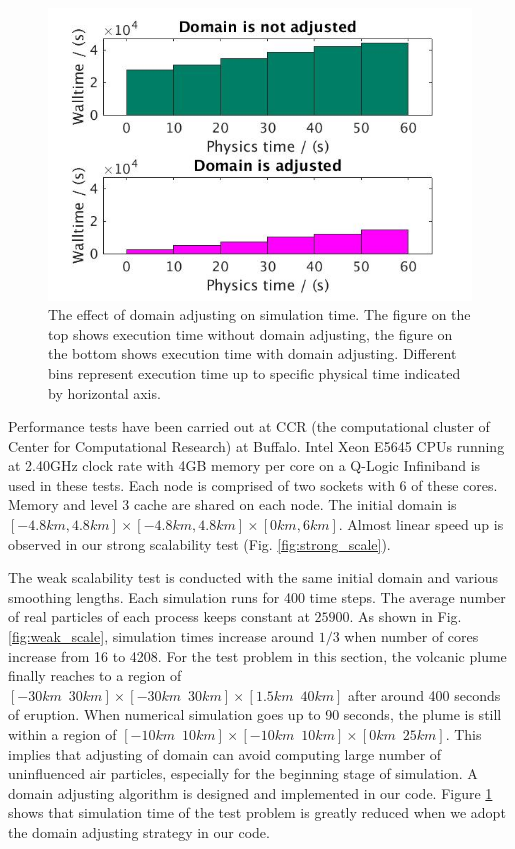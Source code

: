 \documentclass[journal abbreviation, manuscript]{copernicus}
\begin{document}
\begin{figure}[!t]
\centering
\includegraphics[scale=0.35]{adj_vs_no}
\caption{The effect of domain adjusting on simulation time. The figure on the top shows execution time without domain adjusting, the figure on the bottom shows execution time with domain adjusting. Different bins represent execution time up to specific physical time indicated by horizontal axis.}
\label{fig:adj_vs_no}
\end{figure}

Performance tests have been carried out at CCR (the computational cluster of Center for Computational Research) at Buffalo. Intel Xeon E5645 CPUs running at 2.40GHz clock rate with 4GB memory per core on a Q-Logic Infiniband is used in these tests. Each node is comprised of two sockets with 6 of these cores. Memory and level 3 cache are shared on each node. The initial domain is $[-4.8km,4.8km] \times [-4.8km,4.8km] \times [0km, 6km]$. Almost linear speed up is observed in our strong scalability test (Fig. \ref{fig:strong_scale}).

The weak scalability test is conducted with the same initial domain and various smoothing lengths. Each simulation runs for 400 time steps. The average number of real particles of each process keeps constant at $25900$. As shown in Fig. \ref{fig:weak_scale}, simulation times increase around $1/3$ when number of cores increase from 16 to 4208. For the test problem in this section, the volcanic plume finally reaches to a region of $[-30km \,\,\, 30km] \times [-30km\,\,\,30km] \times [1.5km\,\,\,40km]$ after around 400 seconds of eruption. When numerical simulation goes up to 90 seconds, the plume is still within a region of $[-10km\,\,\,10km] \times [-10km\,\,\,10km] \times [0km\,\,\,25km]$. This implies that adjusting of domain can avoid computing large number of uninfluenced air particles, especially for the beginning stage of simulation. A domain adjusting algorithm is designed and implemented in our code. Figure \ref{fig:adj_vs_no} shows that simulation time of the test problem is greatly reduced when we adopt the domain adjusting strategy in our code.
\end{document}
